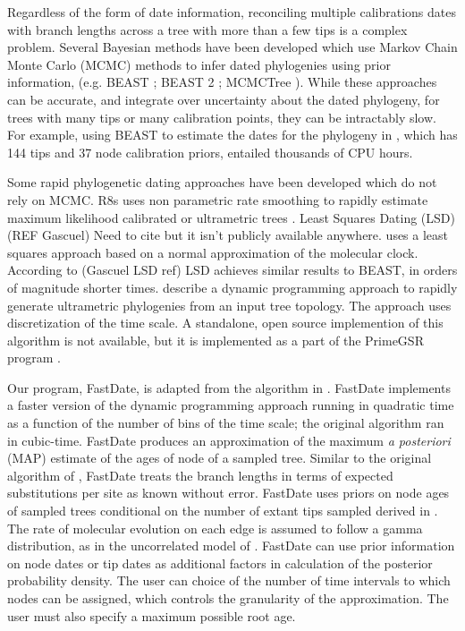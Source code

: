 \documentclass{llncs}
\newcommand{\ejmcomment}[1]{{\color{green} #1}}
\begin{document}
Regardless of the form of date information, reconciling multiple calibrations dates with 
branch lengths across a tree with more than a few tips is a complex problem.
Several Bayesian methods have been developed which use Markov Chain Monte Carlo (MCMC) methods
to infer dated phylogenies using prior information, 
(e.g. BEAST \citealt{Drummond2007}; BEAST 2 \citealt{bouckaert2014}; MCMCTree \citealt{Stadler2013}).
While these approaches can be accurate, and integrate over uncertainty about the dated
phylogeny, for trees with many tips or many calibration points, they can be intractably slow.
For example, using BEAST to estimate the dates for the phylogeny in \citet{Misof2014}, which has 144 tips
and 37 node calibration priors, entailed thousands of CPU hours.

Some rapid phylogenetic dating approaches have been developed which do not rely on MCMC.\@
R8s uses non parametric rate smoothing to rapidly estimate 
maximum likelihood calibrated or ultrametric trees \citep{Sanderson2003}.
Least Squares Dating (LSD) (REF Gascuel) 
\ejmcomment{Need to cite but it isn't publicly available anywhere.}
uses a least squares approach based on a normal approximation of the molecular clock.
According to (Gascuel LSD ref) LSD achieves similar results to BEAST, 
in orders of magnitude shorter times.
\cite{Akerborg2008} describe a dynamic programming approach to 
rapidly generate ultrametric phylogenies from an input tree topology.
The approach uses discretization of the time scale.
A standalone, open source implemention of this algorithm is not available,
but it is implemented as a part of the PrimeGSR program \citep{Akerborg2009}.

Our program, FastDate, is adapted from the algorithm in \cite{Akerborg2008}.
FastDate implements a faster version of the dynamic programming approach running 
in quadratic time as a function of the number of bins of the time scale;
the original algorithm ran in cubic-time.
FastDate produces an approximation of the maximum {\em a posteriori} (MAP)
estimate of the ages of node of a sampled tree.
Similar to the original algorithm of \cite{Akerborg2008}, FastDate treats
the branch lengths in terms of expected substitutions per site as known without error.
FastDate uses priors on node ages of sampled trees conditional on the 
number of extant tips sampled derived in \cite{Stadler2010}.
The rate of molecular evolution on each edge is assumed to follow a 
gamma distribution, as in the uncorrelated model of \cite{BEASTREF-FOR-THIS-MODEL}.
FastDate can use prior information on node dates or tip dates as additional
factors in calculation of the posterior probability density.
The user can choice of the number of time intervals to which 
nodes can be assigned, which controls the granularity of the approximation.
The user must also specify a maximum possible root age.
\end{document}
